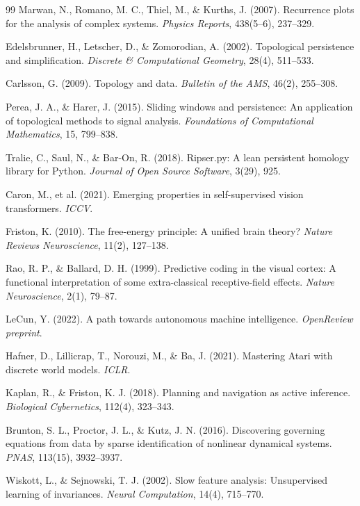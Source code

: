 \documentclass[11pt,a4paper]{article}
\begin{document}
\begin{thebibliography}{99}
Marwan, N., Romano, M. C., Thiel, M., \& Kurths, J. (2007).
Recurrence plots for the analysis of complex systems.
\emph{Physics Reports}, 438(5--6), 237--329.

Edelsbrunner, H., Letscher, D., \& Zomorodian, A. (2002). Topological
persistence and simplification. \emph{Discrete \& Computational
Geometry}, 28(4), 511--533.

Carlsson, G. (2009). Topology and data. \emph{Bulletin of the AMS},
46(2), 255--308.

Perea, J. A., \& Harer, J. (2015). Sliding windows and persistence:
An application of topological methods to signal analysis.
\emph{Foundations of Computational Mathematics}, 15, 799--838.

Tralie, C., Saul, N., \& Bar-On, R. (2018). Ripser.py: A lean
persistent homology library for Python. \emph{Journal of Open Source
Software}, 3(29), 925.

Caron, M., et al. (2021). Emerging properties in self-supervised
vision transformers. \emph{ICCV}.

Friston, K. (2010). The free-energy principle: A unified brain
theory? \emph{Nature Reviews Neuroscience}, 11(2), 127--138.

Rao, R. P., \& Ballard, D. H. (1999). Predictive coding in the visual
cortex: A functional interpretation of some extra-classical
receptive-field effects. \emph{Nature Neuroscience}, 2(1), 79--87.

LeCun, Y. (2022). A path towards autonomous machine intelligence.
\emph{OpenReview preprint}.

Hafner, D., Lillicrap, T., Norouzi, M., \& Ba, J. (2021). Mastering
Atari with discrete world models. \emph{ICLR}.

Kaplan, R., \& Friston, K. J. (2018). Planning and navigation as
active inference. \emph{Biological Cybernetics}, 112(4), 323--343.

Brunton, S. L., Proctor, J. L., \& Kutz, J. N. (2016). Discovering
governing equations from data by sparse identification of nonlinear
dynamical systems. \emph{PNAS}, 113(15), 3932--3937.

Wiskott, L., \& Sejnowski, T. J. (2002). Slow feature analysis:
Unsupervised learning of invariances. \emph{Neural Computation},
14(4), 715--770.


\end{thebibliography}
\end{document}

